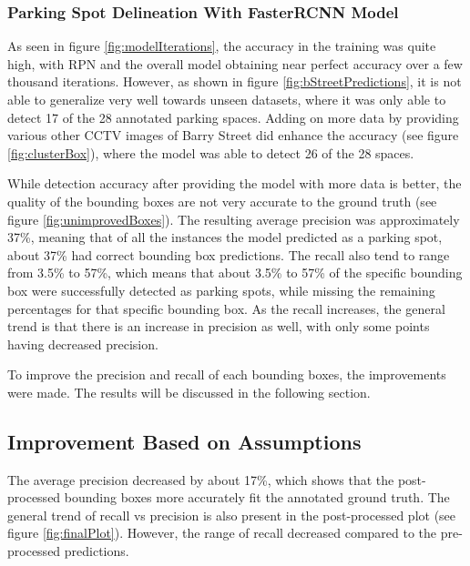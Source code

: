 \documentclass[man]{apa7}
\begin{document}
\subsubsection{Parking Spot Delineation With FasterRCNN Model}

As seen in figure \ref{fig:modelIterations}, the accuracy in the training was quite high, with RPN and the overall model obtaining near perfect accuracy over a few thousand iterations. However, as shown in figure \ref{fig:bStreetPredictions}, it is not able to generalize very well towards unseen datasets, where it was only able to detect 17 of the 28 annotated parking spaces. Adding on more data by providing various other CCTV images of Barry Street did enhance the accuracy (see figure \ref{fig:clusterBox}), where the model was able to detect 26 of the 28 spaces.

While detection accuracy after providing the model with more data is better, the quality of the bounding boxes are not very accurate to the ground truth (see figure \ref{fig:unimprovedBoxes}). The resulting average precision was approximately 37\%, meaning that of all the instances the model predicted as a parking spot, about 37\% had correct bounding box predictions. The recall also tend to range from 3.5\% to 57\%, which means that about 3.5\% to 57\% of the specific bounding box were successfully detected as parking spots, while missing the remaining percentages for that specific bounding box. As the recall increases, the general trend is that there is an increase in precision as well, with only some points having decreased precision.

To improve the precision and recall of each bounding boxes, the improvements were made. The results will be discussed in the following section.

\subsection{Improvement Based on Assumptions}
The average precision decreased by about 17\%, which shows that the post-processed bounding boxes more accurately fit the annotated ground truth. The general trend of recall vs precision is also present in the post-processed plot (see figure \ref{fig:finalPlot}). However, the range of recall decreased compared to the pre-processed predictions. 
\end{document}
